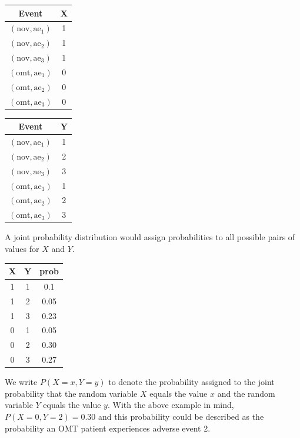 \begin{table}[ht!]
    \centering
    \begin{tabular}{c|c}
        Event & X \\
        \hline
        $(\text{nov},\text{ae}_{1})$ & 1\\
        $(\text{nov},\text{ae}_{2})$ & 1\\
        $(\text{nov},\text{ae}_{3})$ & 1\\
        $(\text{omt},\text{ae}_{1})$ & 0\\
        $(\text{omt},\text{ae}_{2})$ & 0\\
        $(\text{omt},\text{ae}_{3})$ & 0\\
    \end{tabular}
\end{table}

\begin{table}[ht!]
    \centering
    \begin{tabular}{c|c}
        Event & Y \\
        \hline
        $(\text{nov},\text{ae}_{1})$ & 1\\
        $(\text{nov},\text{ae}_{2})$ & 2\\
        $(\text{nov},\text{ae}_{3})$ & 3\\
        $(\text{omt},\text{ae}_{1})$ & 1\\
        $(\text{omt},\text{ae}_{2})$ & 2\\
        $(\text{omt},\text{ae}_{3})$ & 3\\
    \end{tabular}
\end{table}

A joint probability distribution would assign probabilities to all possible pairs of values for $X$ and $Y$. 

\begin{table}[ht!]
    \centering
    \begin{tabular}{c c | c}
        X & Y & prob \\
        \hline
        1 & 1 & 0.1\\
        1 & 2 & 0.05\\
        1 & 3 & 0.23\\
        0 & 1 & 0.05\\
        0 & 2 & 0.30\\
        0 & 3 & 0.27
    \end{tabular}
\end{table}

We write $P(X=x, Y=y)$ to denote the probability assigned to the joint probability that the random variable $X$ equals the value $x$ and the random variable $Y$ equals the value $y$. With the above example in mind, $P(X=0,Y=2) = 0.30$ and this probability could be described as the probability an OMT patient experiences adverse event 2.

